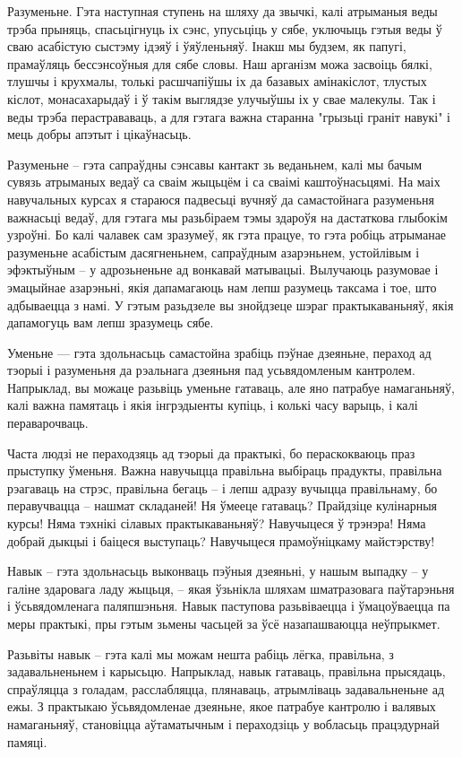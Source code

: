 Разуменьне. Гэта наступная ступень на шляху да звычкі, калі атрыманыя веды трэба прыняць, спасьцігнуць іх сэнс, упусьціць у сябе, уключыць гэтыя веды ў сваю асабістую сыстэму ідэяў і ўяўленьняў. Інакш мы будзем, як папугі, прамаўляць бессэнсоўныя для сябе словы. Наш арганізм можа засвоіць бялкі, тлушчы і крухмалы, толькі расшчапіўшы іх да базавых амінакіслот, тлустых кіслот, монасахарыдаў і ў такім выглядзе улучыўшы іх у свае малекулы. Так і веды трэба перастрававаць, а для гэтага важна старанна "грызьці граніт навукі" і мець добры апэтыт і цікаўнасьць.

Разуменьне – гэта сапраўдны сэнсавы кантакт зь веданьнем, калі мы бачым сувязь атрыманых ведаў са сваім жыцьцём і са сваімі каштоўнасьцямі. На маіх навучальных курсах я стараюся падвесьці вучняў да самастойнага разуменьня важнасьці ведаў, для гэтага мы разьбіраем тэмы здароўя на дастаткова глыбокім узроўні. Бо калі чалавек сам зразумеў, як гэта працуе, то гэта робіць атрыманае разуменьне асабістым дасягненьнем, сапраўдным азарэньнем, устойлівым і эфэктыўным – у адрозьненьне ад вонкавай матывацыі. Вылучаюць разумовае і эмацыйнае азарэньні, якія дапамагаюць нам лепш разумець таксама і тое, што адбываецца з намі. У гэтым разьдзеле вы знойдзеце шэраг практыкаваньняў, якія дапамогуць вам лепш зразумець сябе.

Уменьне — гэта здольнасьць самастойна зрабіць пэўнае дзеяньне, пераход ад тэорыі і разуменьня да рэальнага дзеяньня пад усьвядомленым кантролем. Напрыклад, вы можаце разьвіць уменьне гатаваць, але яно патрабуе намаганьняў, калі важна памятаць і якія інгрэдыенты купіць, і колькі часу варыць, і калі пераварочваць.

Часта людзі не пераходзяць ад тэорыі да практыкі, бо пераскокваюць праз прыступку ўменьня. Важна навучыцца правільна выбіраць прадукты, правільна рэагаваць на стрэс, правільна бегаць – і лепш адразу вучыцца правільнаму, бо перавучвацца – нашмат складаней! Ня ўмееце гатаваць? Прайдзіце кулінарныя курсы! Няма тэхнікі сілавых практыкаваньняў? Навучыцеся ў трэнэра! Няма добрай дыкцыі і баіцеся выступаць? Навучыцеся прамоўніцкаму майстэрству!

Навык – гэта здольнасьць выконваць пэўныя дзеяньні, у нашым выпадку – у галіне здаровага ладу жыцьця, – якая ўзьнікла шляхам шматразовага паўтарэньня і ўсьвядомленага паляпшэньня. Навык паступова разьвіваецца і ўмацоўваецца па меры практыкі, пры гэтым зьмены часьцей за ўсё назапашваюцца неўпрыкмет.

Разьвіты навык – гэта калі мы можам нешта рабіць лёгка, правільна, з задавальненьнем і карысьцю. Напрыклад, навык гатаваць, правільна прысядаць, спраўляцца з голадам, расслабляцца, плянаваць, атрымліваць задавальненьне ад ежы. З практыкаю ўсьвядомленае дзеяньне, якое патрабуе кантролю і валявых намаганьняў, становіцца аўтаматычным і пераходзіць у вобласьць працэдурнай памяці.

